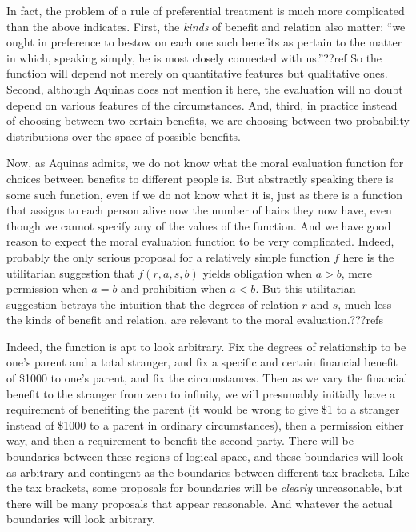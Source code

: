 In fact, the problem of a rule of preferential treatment is much more complicated than the above indicates. First, the \textit{kinds} of benefit and relation also matter: ``we ought in preference 
to bestow on each one such benefits as pertain to the matter in which, speaking simply, he is most closely connected with us.''??ref
So the function will depend not merely on quantitative features but qualitative ones. Second, although Aquinas does not mention it here,
the evaluation will no doubt depend on various features of the circumstances. And, third, in practice instead of choosing between
two certain benefits, we are choosing between two probability distributions over the space of possible benefits.

Now, as Aquinas admits, we do not know what the moral evaluation function for choices between benefits to different people is.
But abstractly speaking there is some such function, even if we do not know what it is, just as there is a function that assigns to each person
alive now the number of hairs they now have, even though we cannot specify any of the values of the function.
And we have good reason to expect the moral evaluation function to be very complicated. Indeed, probably the only serious proposal for a
relatively simple function $f$ here is the utilitarian suggestion that $f(r,a,s,b)$ yields obligation when $a>b$,
mere permission when $a=b$ and prohibition when $a<b$. But this utilitarian suggestion betrays the intuition that
the degrees of relation $r$ and $s$, much less the kinds of benefit and relation, are relevant to the moral evaluation.???refs

Indeed, the function is apt to look arbitrary. Fix the degrees of relationship to be one's parent and a total stranger,
and fix a specific and certain financial benefit of \$1000 to one's parent, and fix the circumstances. Then as we vary the 
financial benefit to the stranger from zero to infinity, we will presumably initially have a requirement of benefiting the parent
(it would be wrong to give \$1 to a stranger instead of \$1000 to a parent in ordinary circumstances), 
then a permission either way, and then a requirement to benefit the second party. There will be boundaries between these regions
of logical space, and these boundaries will look as arbitrary and contingent as the boundaries between different tax brackets.
Like the tax brackets, some proposals for boundaries will be \textit{clearly} unreasonable, but there will be many proposals
that appear reasonable. And whatever the actual boundaries will look arbitrary.

